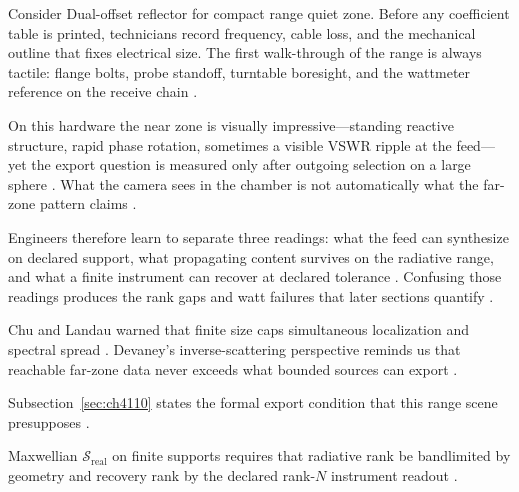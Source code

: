 \begin{physicalvignette}
Consider Dual-offset reflector for compact range quiet zone. Before any coefficient table is printed, technicians record frequency, cable loss, and the mechanical outline that fixes electrical size. The first walk-through of the range is always tactile: flange bolts, probe standoff, turntable boresight, and the wattmeter reference on the receive chain \cite{hansen1988}.

On this hardware the near zone is visually impressive---standing reactive structure, rapid phase rotation, sometimes a visible VSWR ripple at the feed---yet the export question is measured only after outgoing selection on a large sphere \cite{harrington2001}. What the camera sees in the chamber is not automatically what the far-zone pattern claims \cite{stratton1941}.

Engineers therefore learn to separate three readings: what the feed can synthesize on declared support, what propagating content survives on the radiative range, and what a finite instrument can recover at declared tolerance \cite{devaney2004}. Confusing those readings produces the rank gaps and watt failures that later sections quantify \cite{pal2026}.

Chu and Landau warned that finite size caps simultaneous localization and spectral spread \cite{chu1948}. Devaney's inverse-scattering perspective reminds us that reachable far-zone data never exceeds what bounded sources can export \cite{devaney2004}.

Subsection~\ref{sec:ch4110} states the formal export condition that this range scene presupposes \cite{stratton1941}.
\end{physicalvignette}

\label{sec:ch4112}
Maxwellian $\mathcal{S}_{\mathrm{real}}$ on finite supports requires that radiative rank be bandlimited by geometry and recovery rank by the declared rank-$N$ instrument readout \cite{stratton1941}.

